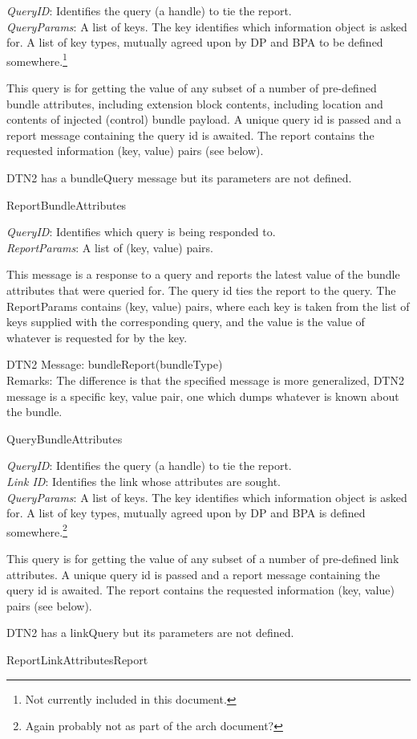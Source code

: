 {
\metP
    {\em  QueryID}: Identifies the query (a handle) to tie the report.\\
    {\em  QueryParams}: A list of keys. The key identifies which information
    object is asked for. A list of key types, mutually agreed upon by DP and
    BPA to be defined somewhere.\footnote{Not currently included in this
    document.}

\metD
    This query is for getting the value of any subset of a number of
    pre-defined bundle attributes, including extension block contents, 
    including location and contents of injected (control)  bundle payload. 
    A unique query id is passed and a
    report message containing the query id is awaited. The report contains
    the requested information (key, value) pairs (see below).

\metM
    DTN2 has a bundleQuery message but its parameters are not defined.

\metR
    ReportBundleAttributes
}

{
\metP
    {\em QueryID}: Identifies which query is being responded to.\\
    {\em ReportParams}: A list of (key, value) pairs.

\metD
    This message is a response to a query and reports the latest value
    of the bundle attributes that were queried for.  The query id ties
    the report to the query. The ReportParams contains (key, value)
    pairs, where each key is taken from the list of keys supplied with
    the corresponding query, and the value is the value of whatever is
    requested for by the key.

\metM
    DTN2 Message: bundleReport(bundleType)\\
    Remarks: The difference is that the specified message is more generalized,
    DTN2 message is a specific key, value pair, one which dumps
    whatever is known about the bundle.

\metR
    QueryBundleAttributes
}

{
\metP
    {\em  QueryID}: Identifies the query (a handle) to tie the report.\\
    {\em  Link ID}: Identifies the link whose attributes are sought.\\
    {\em  QueryParams}: A list of keys. The key identifies which information
    object is asked for. A list of key types, mutually agreed upon by DP and
    BPA is defined somewhere.\footnote{Again probably not as part of the arch
    document?}

\metD
    This query is for getting the value of any subset of a number of
    pre-defined link attributes. A unique query id is passed and a
    report message containing the query id is awaited. The report contains
    the requested information (key, value) pairs (see below).

\metM
    DTN2 has a linkQuery but its parameters are not defined.

\metR
    ReportLinkAttributesReport

}

